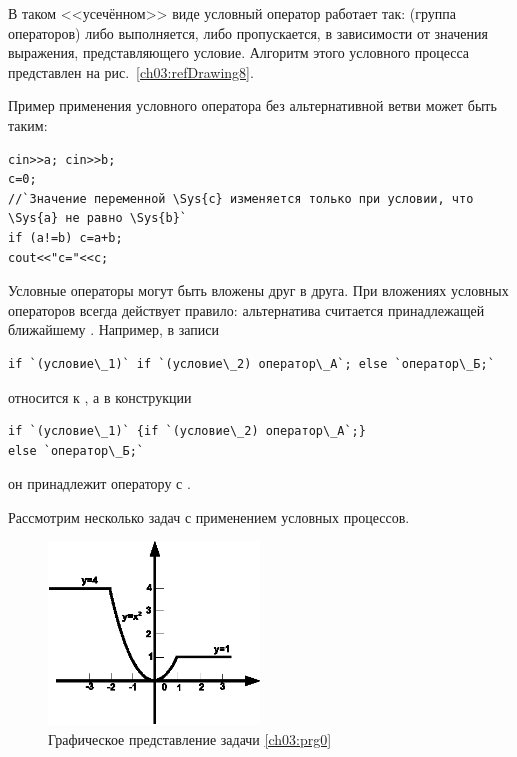 В таком <<усечённом>> виде условный оператор работает так:  (группа операторов) либо
выполняется, либо пропускается, в зависимости от значения выражения, представляющего условие. Алгоритм этого условного
процесса представлен на рис.~\ref{ch03:refDrawing8}.



Пример применения условного оператора без альтернативной ветви  может быть таким:

\begin{lstlisting}
cin>>a; cin>>b;
c=0;
//`Значение переменной \Sys{c} изменяется только при условии, что \Sys{a} не равно \Sys{b}`
if (a!=b) c=a+b;
cout<<"c="<<c;
\end{lstlisting}

Условные операторы могут быть вложены друг в друга. При вложениях условных операторов всегда действует правило:
альтернатива  считается принадлежащей ближайшему . Например, в записи
\begin{lstlisting}
if `(условие\_1)` if `(условие\_2) оператор\_А`; else `оператор\_Б;`
\end{lstlisting}
 относится к , а в конструкции
\begin{lstlisting}
if `(условие\_1)` {if `(условие\_2) оператор\_А`;} 
else `оператор\_Б;`
\end{lstlisting}
он принадлежит оператору  с . 

Рассмотрим несколько задач с применением условных процессов.


\begin{figure}[htb]
\begin{center}
\includegraphics[width=0.5\textwidth]{img/ris_3_10}
\caption{Графическое представление задачи \ref{ch03:prg0}}
\label{ch03:refDrawing9}
\end{center}
\end{figure}

